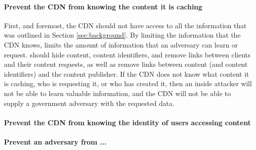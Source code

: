 
\paragraph{Prevent the CDN from knowing the content it is caching} First, and foremost, the CDN 
should not have access to all the information that was outlined 
in Section \ref{sec:background}.  By limiting the information that the CDN knows, \system{} limits 
the amount of information that an adversary can learn or request.  \system{} should hide 
content, content identifiers, and remove links between clients and their content requests, as well 
as remove links between content (and content identifiers) and the content publisher.  If the CDN 
does not know what content it is caching, who is requesting it, or who has created it, then an 
inside attacker will not be able to learn valuable information, and the CDN will not be able to supply 
a government adversary with the requested data.

\paragraph{Prevent the CDN from knowing the identity of users accessing content}

\paragraph{Prevent an adversary from ...} 

